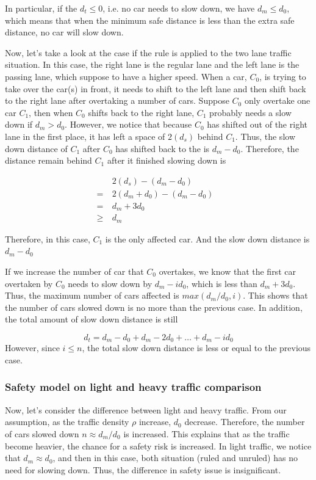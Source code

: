 In particular, if the $d_t \le 0$, i.e. no car needs to slow down, we have $d_m\le d_0$, which means that when the minimum safe distance is less than the extra safe distance, no car will slow down. 

Now, let's take a look at the case if the rule is applied to the two lane traffic situation. In this case, the right lane is the regular lane and the left lane is the passing lane, which suppose to have a higher speed. When a car, $C_0$, is trying to take over the car(s) in front, it needs to shift to the left lane and then shift back to the right lane after overtaking a number of cars. Suppose $C_0$ only overtake one car $C_1$, then when $C_0$ shifts back to the right lane, $C_1$ probably needs a slow down if $d_m>d_0$. However, we notice that because $C_0$ has shifted out of the right lane in the first place, it has left a space of $2(d_s)$ behind $C_1$. Thus, the slow down distance of $C_1$ after $C_0$ has shifted back to the is $d_m-d_0$. Therefore, the distance remain behind $C_1$ after it finished slowing down is

\begin{align}
&2(d_s)-(d_m-d_0)&\\
=\ &2(d_m+d_0)-(d_m-d_0)&\\
=\ &d_m+3d_0&\\
\ge \ &d_m&
\end{align}

Therefore, in this case, $C_1$ is the only affected car. And the slow down distance is $d_m-d_0$

If we increase the number of car that $C_0$ overtakes, we know that the first car overtaken by $C_0$ needs to slow down by $d_m-id_0$, which is less than $d_m+3d_0$. Thus, the maximum number of cars affected is $max(d_m/d_0, i)$. This shows that the number of cars slowed down is no more than the previous case. In addition, the total amount of slow down distance is still

\begin{equation}
d_t = d_m-d_0 + d_m-2d_0 + \dots + d_m - id_0 
\end{equation}
However, since $i\le n$, the total slow down distance is less or equal to the previous case. 


\subsubsection{Safety model on light and heavy traffic comparison}

Now, let's consider the difference between light and heavy traffic. From our assumption, as the traffic density $\rho$ increase, $d_0$ decrease. Therefore, the number of cars slowed down $n\approx d_m/d_0$ is increased. This explains that as the traffic become heavier, the chance for a safety risk is increased. In light traffic, we notice that $d_m \approx d_0$, and then in this case, both situation (ruled and unruled) has no need for slowing down. Thus, the difference in safety issue is insignificant. 


